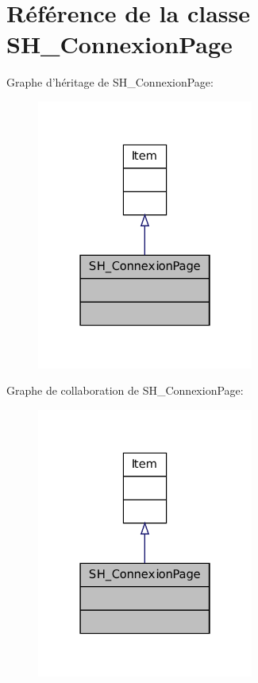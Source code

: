 \hypertarget{classSH__ConnexionPage}{\section{Référence de la classe S\-H\-\_\-\-Connexion\-Page}
\label{classSH__ConnexionPage}
}


Graphe d'héritage de S\-H\-\_\-\-Connexion\-Page\-:\nopagebreak
\begin{figure}[H]
\begin{center}
\leavevmode
\includegraphics[width=202pt]{classSH__ConnexionPage__inherit__graph}
\end{center}
\end{figure}


Graphe de collaboration de S\-H\-\_\-\-Connexion\-Page\-:\nopagebreak
\begin{figure}[H]
\begin{center}
\leavevmode
\includegraphics[width=202pt]{classSH__ConnexionPage__coll__graph}
\end{center}
\end{figure}
